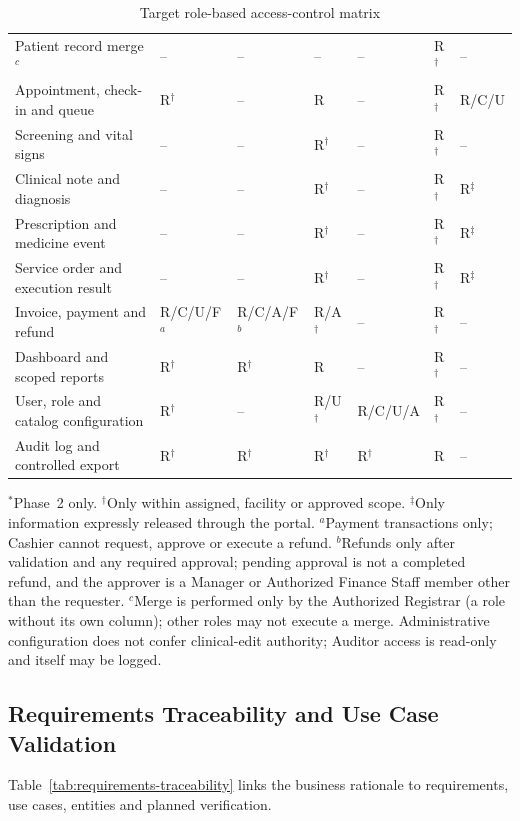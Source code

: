 \documentclass[a4paper,12pt]{article}
\begin{document}
\begin{table}[p]
\begin{tabular}{@{}p{}*{6}{>{\centering\arraybackslash}p{}}@{}}
Patient record merge$^{c}$ & -- & -- & -- & -- & R$^{\dagger}$ & -- \\
Appointment, check-in and queue & R$^{\dagger}$ & -- & R & -- & R$^{\dagger}$ & R/C/U \\
Screening and vital signs & -- & -- & R$^{\dagger}$ & -- & R$^{\dagger}$ & -- \\
Clinical note and diagnosis & -- & -- & R$^{\dagger}$ & -- & R$^{\dagger}$ & R$^{\ddagger}$ \\
Prescription and medicine event & -- & -- & R$^{\dagger}$ & -- & R$^{\dagger}$ & R$^{\ddagger}$ \\
Service order and execution result & -- & -- & R$^{\dagger}$ & -- & R$^{\dagger}$ & R$^{\ddagger}$ \\
Invoice, payment and refund & R/C/U/F$^{a}$ & R/C/A/F$^{b}$ & R/A$^{\dagger}$ & -- & R$^{\dagger}$ & -- \\
Dashboard and scoped reports & R$^{\dagger}$ & R$^{\dagger}$ & R & -- & R$^{\dagger}$ & -- \\
User, role and catalog configuration & R$^{\dagger}$ & -- & R/U$^{\dagger}$ & R/C/U/A & R$^{\dagger}$ & -- \\
Audit log and controlled export & R$^{\dagger}$ & R$^{\dagger}$ & R$^{\dagger}$ & R$^{\dagger}$ & R & -- \\
\bottomrule
\end{tabular}
\caption{Target role-based access-control matrix}
\label{tab:rbac-matrix}
\vspace{0.2cm}
\begin{minipage}{0.90\textwidth}\tiny
$^{*}$Phase~2 only. $^{\dagger}$Only within assigned, facility or approved scope. $^{\ddagger}$Only information expressly released through the portal. $^{a}$Payment transactions only; Cashier cannot request, approve or execute a refund. $^{b}$Refunds only after validation and any required approval; pending approval is not a completed refund, and the approver is a Manager or Authorized Finance Staff member other than the requester. $^{c}$Merge is performed only by the Authorized Registrar (a role without its own column); other roles may not execute a merge. Administrative configuration does not confer clinical-edit authority; Auditor access is read-only and itself may be logged.
\end{minipage}
\end{table}

\subsection{Requirements Traceability and Use Case Validation}
Table~\ref{tab:requirements-traceability} links the business rationale to requirements, use cases, entities and planned verification.
\end{document}
